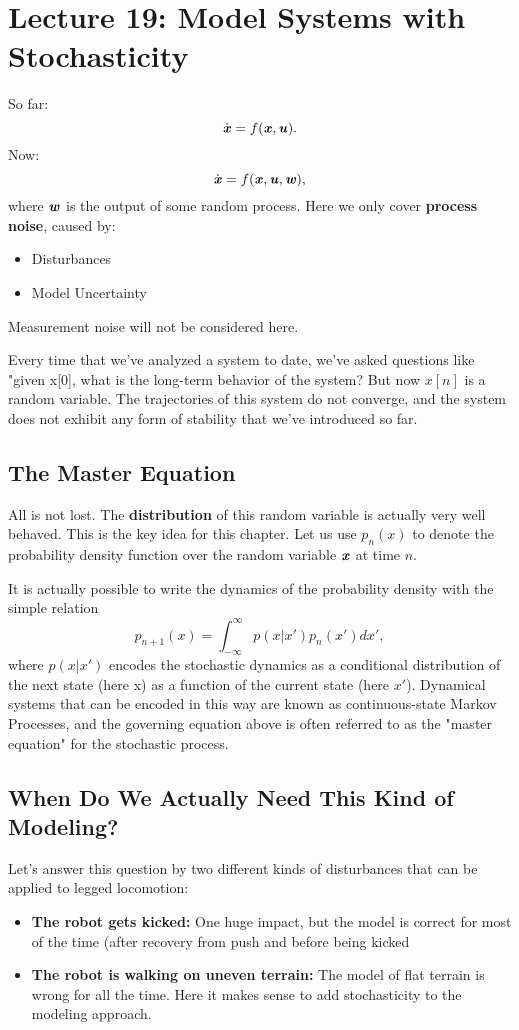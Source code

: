 \chapter{Lecture 19: Model Systems with Stochasticity}
So far: 
$$\dot{\bm{\mathit{x}}}=f(\bm{\mathit{x}},\bm{\mathit{u}}).$$
Now: 
$$\dot{\bm{\mathit{x}}}=f(\bm{\mathit{x}},\bm{\mathit{u}},\bm{\mathit{w}}),$$
where $\bm{\mathit{w}}$ is the output of some random process. Here we only cover \textbf{process noise}, caused by:
\begin{itemize}
\item Disturbances
\item Model Uncertainty
\end{itemize}
Measurement noise will not be considered here.

Every time that we've analyzed a system to date, we've asked questions like "given x[0], what is the long-term behavior of the system? But now $x[n]$ is a random variable. The trajectories of this system do not converge, and the system does not exhibit any form of stability that we've introduced so far. 


\section{The Master Equation}
All is not lost. The \textbf{distribution} of this random variable is actually very well behaved. This is the key idea for this chapter. Let us use $p_n(x)$ to denote the probability density function over the random variable $\bm{\mathit{x}}$ at time $n$.

It is actually possible to write the dynamics of the probability density with the simple relation 
$$p_{n+1}(x) = \int_{-\infty}^\infty p(x|x') p_n(x') dx',$$
where $p(x|x')$ encodes the stochastic dynamics as a conditional distribution of the next state (here x) as a function of the current state (here $x'$). Dynamical systems that can be encoded in this way are known as continuous-state Markov Processes, and the governing equation above is often referred to as the "master equation" for the stochastic process.


\section{When Do We Actually Need This Kind of Modeling?}
Let's answer this question by two different kinds of disturbances that can be applied to legged locomotion: 
\begin{itemize}
\item \textbf{The robot gets kicked:} One huge impact, but the model is correct for most of the time (after recovery from push and before being kicked
\item \textbf{The robot is walking on uneven terrain:} The model of flat terrain is wrong for all the time. Here it makes sense to add stochasticity to the modeling approach.
\end{itemize}